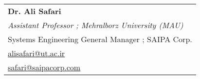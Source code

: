 
\begin{tabular}{ l }
{\footnotesize\textbf{Dr. Ali Safari}}\\
{\footnotesize\textit{Assistant Professor ; Mehralborz University (MAU)}}\\
{\footnotesize Systems Engineering General Manager ; SAIPA Corp.}\\
{\footnotesize \underline{\href{mailto:alisafari@ut.ac.ir}{alisafari@ut.ac.ir}}}\\
{\footnotesize \underline{\href{mailto:safari@saipacorp.com}{safari@saipacorp.com}}}\\

\end{tabular}